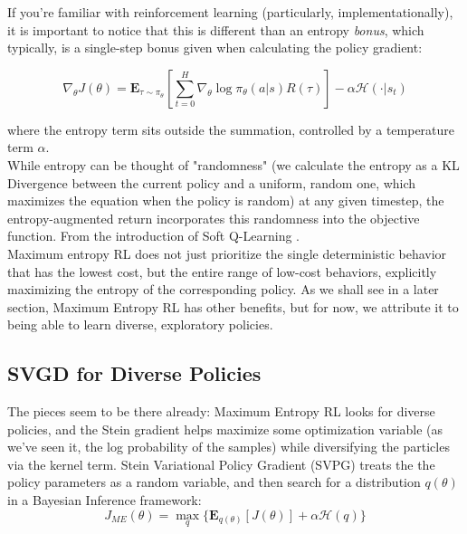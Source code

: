 \documentclass[12pt]{article}
\begin{document}
\noindent  If you're familiar with reinforcement learning (particularly, implementationally), it is important to notice that this is different than an entropy \textit{bonus}, which typically, is a single-step bonus given when calculating the policy gradient:

\begin{equation}
    \nabla_\theta J(\theta) = \mathbf{E}_{\tau \sim \pi_\theta} [\sum_{t=0}^H \nabla_\theta \log \pi_\theta(a | s)R(\tau)] - \alpha \mathcal{H}( \cdot | s_t) 
\end{equation}

\noindent  where the entropy term sits outside the summation, controlled by a temperature term $\alpha$. \\ 

\noindent While entropy can be thought of "randomness" (we calculate the entropy as a KL Divergence between the current policy and a uniform, random one, which maximizes the equation when the policy is random) at any given timestep, the entropy-augmented return incorporates this randomness into the objective function. From the introduction of Soft Q-Learning \cite{haarnoja2017reinforcement}. \\

\noindent Maximum entropy RL does not just prioritize the single deterministic behavior that has the lowest cost, but the entire range of low-cost behaviors, explicitly maximizing the entropy of the corresponding policy. As we shall see in a later section, Maximum Entropy RL has other benefits, but for now, we attribute it to being able to learn diverse, exploratory policies.

\subsection{SVGD for Diverse Policies}

\noindent The pieces seem to be there already: Maximum Entropy RL looks for diverse policies, and the Stein gradient helps maximize some optimization variable (as we've seen it, the log probability of the samples) while diversifying the particles via the kernel term. Stein Variational Policy Gradient (SVPG) treats the the policy parameters as a random variable, and then search for a distribution $q(\theta)$ in a Bayesian Inference framework:\\

\begin{equation}
    J_{ME}(\theta) = \max_q \{ \mathbf{E}_{q(\theta)}[J(\theta)] + \alpha \mathcal{H}(q)\}
\end{equation}
\end{document}
